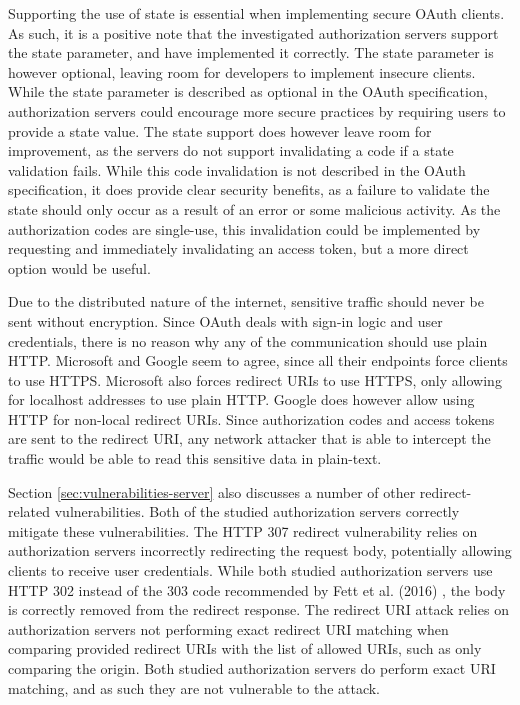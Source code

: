 Supporting the use of state is essential when implementing secure OAuth clients.
As such, it is a positive note that the investigated authorization servers support the state parameter, and have implemented it correctly.
The state parameter is however optional, leaving room for developers to implement insecure clients.
While the state parameter is described as optional in the OAuth specification, authorization servers could encourage more secure practices by requiring users to provide a state value.
The state support does however leave room for improvement, as the servers do not support invalidating a code if a state validation fails.
While this code invalidation is not described in the OAuth specification, it does provide clear security benefits, as a failure to validate the state should only occur as a result of an error or some malicious activity.
As the authorization codes are single-use, this invalidation could be implemented by requesting and immediately invalidating an access token, but a more direct option would be useful.

Due to the distributed nature of the internet, sensitive traffic should never be sent without encryption.
Since OAuth deals with sign-in logic and user credentials, there is no reason why any of the communication should use plain HTTP.
Microsoft and Google seem to agree, since all their endpoints force clients to use HTTPS.
Microsoft also forces redirect URIs to use HTTPS, only allowing for localhost addresses to use plain HTTP.
Google does however allow using HTTP for non-local redirect URIs.
Since authorization codes and access tokens are sent to the redirect URI, any network attacker that is able to intercept the traffic would be able to read this sensitive data in plain-text.

Section \ref{sec:vulnerabilities-server} also discusses a number of other redirect-related vulnerabilities.
Both of the studied authorization servers correctly mitigate these vulnerabilities.
The HTTP 307 redirect vulnerability relies on authorization servers incorrectly redirecting the request body, potentially allowing clients to receive user credentials.
While both studied authorization servers use HTTP 302 instead of the 303 code recommended by Fett et al. (2016) \citep{fett_comprehensive_2016}, the body is correctly removed from the redirect response.
The redirect URI attack relies on authorization servers not performing exact redirect URI matching when comparing provided redirect URIs with the list of allowed URIs, such as only comparing the origin.
Both studied authorization servers do perform exact URI matching, and as such they are not vulnerable to the attack.

